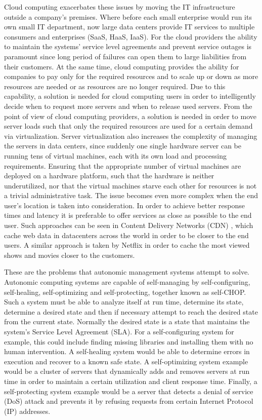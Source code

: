 Cloud computing exacerbates these issues by moving the IT infrastructure outside a company's premises. Where before each small enterprise would run its own small IT department, now large data centers provide IT services to multiple consumers and enterprises (SaaS, HaaS, IaaS). For the cloud providers the ability to maintain the systems' service level agreements and prevent service outages is paramount since long period of failures can open them to large liabilities from their customers. At the same time, cloud computing provides the ability for companies to pay only for the required resources and to scale up or down as more resources are needed or as resources are no longer required. Due to this capability, a solution is needed for cloud computing users in order to intelligently decide when to request more servers and when to release used servers. From the point of view of cloud computing providers, a solution is needed in order to move server loads such that only the required resources are used for a certain demand via virtualization. Server virtualization also increases the complexity of managing the servers in data centers, since suddenly one single hardware server can be running tens of virtual machines, each with its own load and processing requirements. Ensuring that the appropriate number of virtual machines are deployed on a hardware platform, such that the hardware is neither underutilized, nor that the virtual machines starve each other for resources is not a trivial administrative task. The issue becomes even more complex when the end user's location is taken into consideration. In order to achieve better response times and latency it is preferable to offer services as close as possible to the end user. Such approaches can be seen in Content Delivery Networks (CDN) \cite{akamai}, which cache web data in datacenters across the world in order to be closer to the end users. A similar approach is taken by Netflix in order to cache the most viewed shows and movies closer to the customers.

These are the problems that autonomic management systems attempt to solve. Autonomic computing systems are capable of self-managing by self-configuring, self-healing, self-optimizing and self-protecting, together known as self-CHOP. Such a system must be able to analyze itself at run time, determine its state, determine a desired state and then if necessary attempt to reach the desired state from the current state. Normally the desired state is a state that maintains the system's Service Level Agreement (SLA). For a self-configuring system for example, this could include finding missing libraries and installing them with no human intervention. A self-healing system would be able to determine errors in execution and recover to a known safe state. A self-optimizing system example would be a cluster of servers that dynamically adds and removes servers at run time in order to maintain a certain utilization and client response time. Finally, a self-protecting system example would be a server that detects a denial of service (DoS) attack and prevents it by refusing requests from certain Internet Protocol (IP) addresses.

